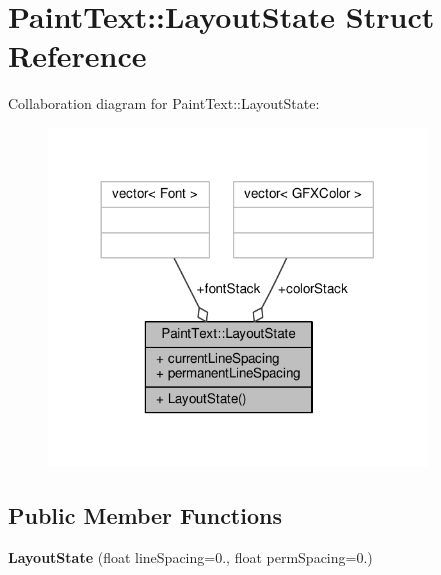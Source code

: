 \hypertarget{structPaintText_1_1LayoutState}{}\section{Paint\+Text\+:\+:Layout\+State Struct Reference}
\label{structPaintText_1_1LayoutState}


Collaboration diagram for Paint\+Text\+:\+:Layout\+State\+:
\nopagebreak
\begin{figure}[H]
\begin{center}
\leavevmode
\includegraphics[width=284pt]{d0/d72/structPaintText_1_1LayoutState__coll__graph}
\end{center}
\end{figure}
\subsection*{Public Member Functions}
\begin{DoxyCompactItemize}
\item 
{\bfseries Layout\+State} (float line\+Spacing=0., float perm\+Spacing=0.)\hypertarget{structPaintText_1_1LayoutState_a1ceccbdc959d22ef389bd126897f8c05}{}\label{structPaintText_1_1LayoutState_a1ceccbdc959d22ef389bd126897f8c05}

\end{DoxyCompactItemize}
